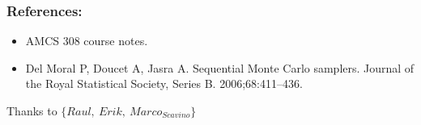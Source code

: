 \documentclass[aspectratio=169]{beamer}\usepackage[utf8]{inputenc}
\begin{document}
\begin{frame}\frametitle{References: }
\begin{itemize}
\item AMCS 308 course notes.
\item  Del Moral P, Doucet A, Jasra A. Sequential Monte Carlo samplers. Journal of the Royal Statistical Society, Series B. 2006;68:411–436.
\end{itemize}
\end{frame}


\begin{frame}
Thanks to $ \{ Raul, \ Erik, \ Marco_{{Scavino}} \}$
\end{frame}
\end{document}
